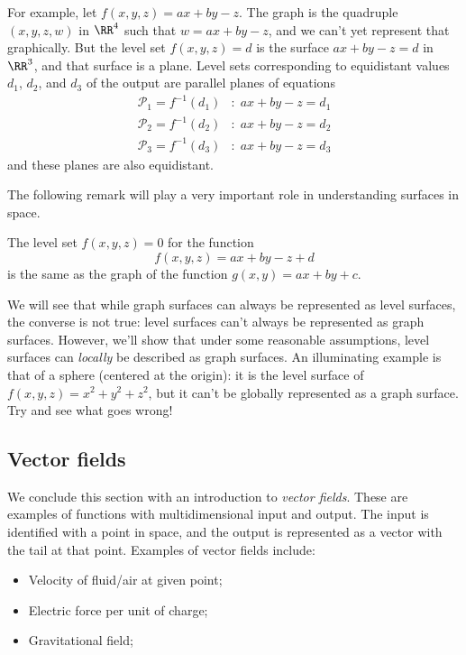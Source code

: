 For example, let $f(x,y,z) = ax+by-z$. The graph is the
quadruple $(x,y,z,w)$ in $\RR^4$ such that
$w = ax+by-z$, and we can't yet represent that
graphically. But the level set $f(x,y,z) = d$ is the
surface $ax+by-z = d$ in $\RR^3$, and that surface is a
plane. Level sets corresponding to equidistant values
$d_1$, $d_2$, and $d_3$ of the output are parallel
planes of equations
%
\begin{align*}
  \mathcal{P}_1 = f^{-1}(d_1) & \colon \; ax+by-z = d_1\\
  \mathcal{P}_2 = f^{-1}(d_2) & \colon \; ax+by-z = d_2\\
  \mathcal{P}_3 = f^{-1}(d_3) & \colon \; ax+by-z = d_3
\end{align*}
%
and these planes are also equidistant.

The following remark will play a very important role in
understanding surfaces in space.

\begin{rmk}{\rm The level set $f(x,y,z)=0$ for the
function
%
$$f(x,y,z) = ax+by-z+d$$
%
is the same as the graph
of the function $g(x,y) = ax+by+c$.
}\end{rmk}

We will see that while graph surfaces can always be
represented as level surfaces, the converse is not true:
level surfaces can't always be represented as graph
surfaces. However, we'll show that under some reasonable
assumptions, level surfaces can \emph{locally} be
described as graph surfaces. An illuminating example is
that of a sphere (centered at the origin): it is the
level surface of $f(x,y,z) = x^2+y^2+z^2$, but it can't
be globally represented as a graph surface. Try and see
what goes wrong!



\subsection{Vector fields} We conclude this section
with an introduction to \emph{vector fields}.
These are examples of functions with multidimensional
input and output. The
input is identified with a point in space,
and the output is represented as a vector with
the tail at that point. Examples of vector fields include:

\begin{itemize}
  \item Velocity of fluid/air at given point;
  \item Electric force per unit of charge;
  \item Gravitational field;
\end{itemize}

